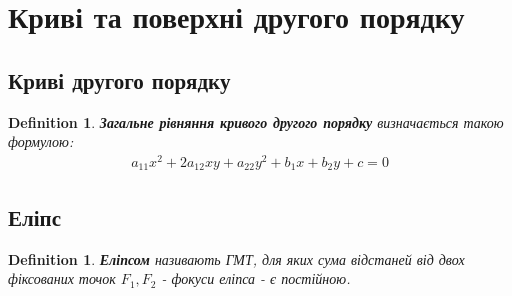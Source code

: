 \documentclass[a4paper, 10pt]{extarticle}
\theoremstyle{theoremdd}
\theoremstyle{theoremdd}
\newtheorem{definition}[theorem]{Definition}
\theoremstyle{theoremdd}
\theoremstyle{theoremdd}
\theoremstyle{theoremdd}
\theoremstyle{theoremdd}
\theoremstyle{theoremdd}
\theoremstyle{theoremdd}
\begin{document}
\section{Криві та поверхні другого порядку}
\subsection*{Криві другого порядку}
\begin{definition}
\textbf{Загальне рівняння кривого другого порядку} визначається такою формулою:
\begin{align*}
a_{11}x^2 + 2a_{12}xy + a_{22}y^2 + b_1x+b_2y+c=0
\end{align*}
\end{definition}

\subsection{Еліпс}
\begin{definition}
\textbf{Еліпсом} називають ГМТ, для яких сума відстаней від двох фіксованих точок $F_1,F_2$ - фокуси еліпса - є постійною.
\begin{figure}[H]
\centering
{}
\end{figure}
\end{definition}
\end{document}

